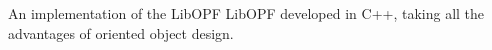 An implementation of the Lib\+O\+P\+F Lib\+O\+P\+F developed in C++, taking all the advantages of oriented object design. 